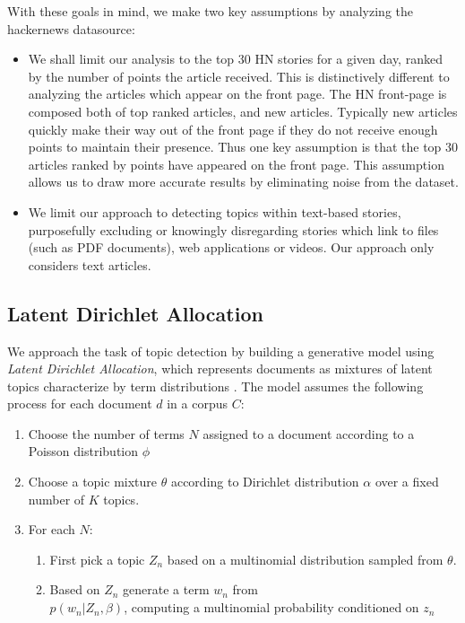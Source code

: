 \documentclass[11pt,journal,final,a4paper]{IEEEtran}
\begin{document}
With these goals in mind, we make two key assumptions by analyzing the hackernews datasource:
\begin{itemize}
\item We shall limit our analysis to the top 30 HN stories for a given day, ranked by the number of points the article received. This is distinctively different to analyzing the articles which appear on the front page. The HN front-page is composed both of top ranked articles, and new articles. Typically new articles quickly make their way out of the front page if they do not receive enough points to maintain their presence. Thus one key assumption is that the top 30 articles ranked by points have appeared on the front page. This assumption allows us to draw more accurate results by eliminating noise from the dataset. 
\item We limit our approach to detecting topics within text-based stories, purposefully excluding or knowingly disregarding stories which link to files (such as PDF documents), web applications or videos. Our approach only considers text articles. 
\end{itemize}

\subsection{Latent Dirichlet Allocation}
We approach the task of topic detection by building a generative model using \textit{Latent Dirichlet Allocation}, which represents documents as mixtures of latent topics characterize by term distributions \cite{lda:bengio-ng}. The model assumes the following process for each document $d$ in a corpus $C$:
\begin{enumerate}
\item Choose the number of terms $N$ assigned to a document according to a Poisson distribution $\phi$
\item Choose a topic mixture $\theta$ according to Dirichlet distribution $\alpha$ over a fixed number of $K$ topics. 
\item For each $N$:
\begin{enumerate}
\item First pick a topic $Z_{n}$ based on a multinomial distribution sampled from $\theta$.
\item Based on $Z_{n}$ generate a term $w_{n}$ from \\ 
$p(w_{n}|Z_{n},\beta)$, computing a multinomial probability conditioned on $z_{n}$

\end{enumerate}
\end{enumerate}
\end{document}
